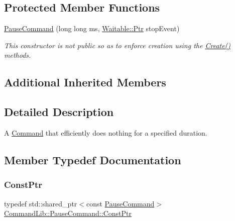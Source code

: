 \subsection*{Protected Member Functions}
\begin{DoxyCompactItemize}
\item 
\mbox{\hyperlink{class_command_lib_1_1_pause_command_a777f5a05a5ed78abeafcfbc7e1d27072}{Pause\+Command}} (long long ms, \mbox{\hyperlink{class_command_lib_1_1_waitable_ac74b6b91e48220146eada76a31cf2d9b}{Waitable\+::\+Ptr}} stop\+Event)
\begin{DoxyCompactList}\small\item\em This constructor is not public so as to enforce creation using the \mbox{\hyperlink{class_command_lib_1_1_pause_command_acf08990d56d99bcec76588d786c980e7}{Create()}} methods. \end{DoxyCompactList}\end{DoxyCompactItemize}
\subsection*{Additional Inherited Members}


\subsection{Detailed Description}
A \mbox{\hyperlink{class_command_lib_1_1_command}{Command}} that efficiently does nothing for a specified duration.



\subsection{Member Typedef Documentation}
\mbox{\label{class_command_lib_1_1_pause_command_ad14df8483794045a09d0b08007cbf289}} 
\subsubsection{\texorpdfstring{Const\+Ptr}{ConstPtr}}
{\footnotesize\ttfamily typedef std\+::shared\+\_\+ptr$<$const \mbox{\hyperlink{class_command_lib_1_1_pause_command}{Pause\+Command}}$>$ \mbox{\hyperlink{class_command_lib_1_1_pause_command_ad14df8483794045a09d0b08007cbf289}{Command\+Lib\+::\+Pause\+Command\+::\+Const\+Ptr}}}



